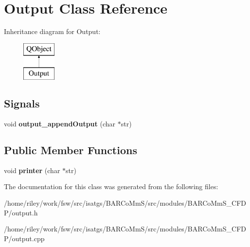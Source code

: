 \hypertarget{class_output}{}\section{Output Class Reference}
\label{class_output}
Inheritance diagram for Output\+:\begin{figure}[H]
\begin{center}
\leavevmode
\includegraphics[height=2.000000cm]{class_output}
\end{center}
\end{figure}
\subsection*{Signals}
\begin{DoxyCompactItemize}
\item 
void {\bfseries output\+\_\+append\+Output} (char $\ast$str)\hypertarget{class_output_a7fedf8dc52fa6244c72b7ccc6fa87a3d}{}\label{class_output_a7fedf8dc52fa6244c72b7ccc6fa87a3d}

\end{DoxyCompactItemize}
\subsection*{Public Member Functions}
\begin{DoxyCompactItemize}
\item 
void {\bfseries printer} (char $\ast$str)\hypertarget{class_output_a1284884752d63797713902db09b9de04}{}\label{class_output_a1284884752d63797713902db09b9de04}

\end{DoxyCompactItemize}


The documentation for this class was generated from the following files\+:\begin{DoxyCompactItemize}
\item 
/home/riley/work/fsw/src/isatgs/\+B\+A\+R\+Co\+Mm\+S/src/modules/\+B\+A\+R\+Co\+Mm\+S\+\_\+\+C\+F\+D\+P/output.\+h\item 
/home/riley/work/fsw/src/isatgs/\+B\+A\+R\+Co\+Mm\+S/src/modules/\+B\+A\+R\+Co\+Mm\+S\+\_\+\+C\+F\+D\+P/output.\+cpp\end{DoxyCompactItemize}
